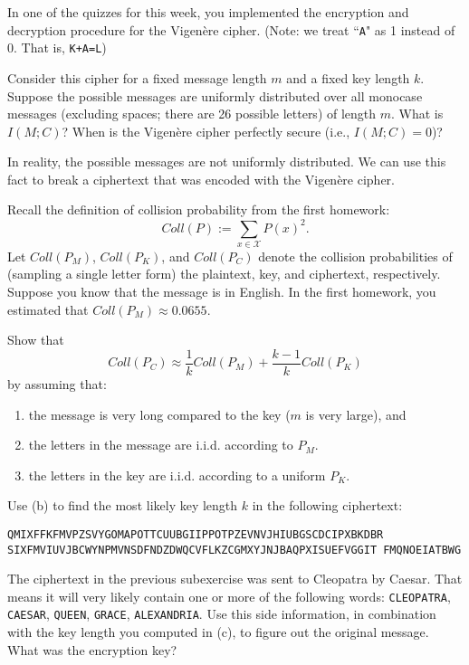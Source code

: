 \documentclass[a4paper,10pt,landscape,twocolumn]{scrartcl}
\begin{document}
\begin{exercise}[Programming (7pt)]
	In one of the quizzes for this week, you implemented the encryption and decryption procedure for the Vigen\`{e}re cipher. (Note: we treat ``\texttt{A}" as 1 instead of 0. That is, \texttt{K+A=L})
	\begin{subex}[(1pt)]
		Consider this cipher for a fixed message length $m$ and a fixed key length $k$.
		Suppose the possible messages are uniformly distributed over all monocase messages (excluding spaces; there are 26 possible letters) of length $m$. What is $I(M;C)$? When is the Vigen\`ere cipher perfectly secure (i.e., $I(M;C) = 0$)?
	\end{subex}
	In reality, the possible messages are not uniformly distributed. We can use this fact to break a ciphertext that was encoded with the Vigen\`{e}re cipher.
	
	Recall the definition of collision probability from the first homework:
	\[
	Coll(P) := \sum_{x \in \mathcal{X}} P(x)^2.
	\]
	Let $Coll(P_M)$, $Coll(P_K)$, and $Coll(P_C)$ denote the collision probabilities of (sampling a single letter form) the plaintext, key, and ciphertext, respectively. Suppose you know that the message is in English. In the first homework, you estimated that $Coll(P_M) \approx 0.0655$.
	\begin{subex}[(2pt)]
		Show that
		\[
		Coll(P_C) \approx \frac{1}{k} Coll(P_M) + \frac{k-1}{k} Coll(P_K)
		\]
		by assuming that:
		\begin{enumerate}
			\item the message is very long compared to the key ($m$ is very large), and
			\item the letters in the message are i.i.d. according to $P_M$.
			\item the letters in the key are i.i.d. according to a uniform $P_K$.
		\end{enumerate}
	\end{subex}
	\begin{subex}[(2pt)]
		Use (b) to find the most likely key length $k$ in the following ciphertext:
		\begin{center}
			\texttt{QMIXFFKFMVPZSVYGOMAPOTTCUUBGIIPPOTPZEVNVJHIUBGSCDCIPXBKDBR
			SIXFMVIUVJBCWYNPMVNSDFNDZDWQCVFLKZCGMXYJNJBAQPXISUEFVGGIT
			FMQNOEIATBWG}
		\end{center}
	\end{subex}
	\begin{subex}[(2pt)]
		The ciphertext in the previous subexercise was sent to Cleopatra by Caesar. That means it will very likely contain one or more of the following words: \texttt{CLEOPATRA}, \texttt{CAESAR}, \texttt{QUEEN}, \texttt{GRACE}, \texttt{ALEXANDRIA}. Use this side information, in combination with the key length you computed in (c), to figure out the original message. What was the encryption key?
	\end{subex}
\end{exercise}
\end{document}
